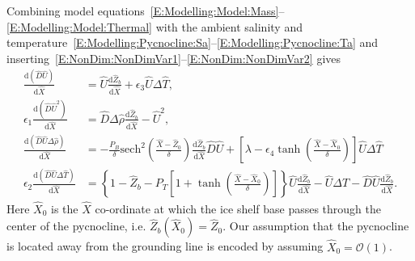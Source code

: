 \documentclass{jfm}
\newcommand{\dd}[2]{\frac{\mathrm{d} #1}{\mathrm{d} #2}}
\newcommand{\order}[1]{\mathcal{O}(#1)}
\newcommand{\epsone}{\epsilon_{1}} %
\newcommand{\epstwo}{\epsilon_{2}} %
\newcommand{\epsthree}{\epsilon_{3}} %
\newcommand{\epsfour}{\epsilon_{4}}
\newcommand{\Pb}{\textit{P}_B}  %
\newcommand{\lt}{\delta} %
\newcommand{\Pt}{\textit{P}_T}
\begin{document}
Combining model equations~\eqref{E:Modelling:Model:Mass}--\eqref{E:Modelling:Model:Thermal} with the ambient salinity and temperature~\eqref{E:Modelling:Pycnocline:Sa}--\eqref{E:Modelling:Pycnocline:Ta} and inserting~\eqref{E:NonDim:NonDimVar1}--\eqref{E:NonDim:NonDimVar2} gives
\begin{align}
\dd{(\hat{D}\hat{U})}{\hat{X}} &= \hat{U} \dd{\hat{Z}_b}{\hat{X}} +\epsthree \hat{U} \Delta \hat{T},\label{E:NonDim:mass}\\
\epsone \dd{(\hat{D}\hat{U}^2)}{\hat{X}} &= \hat{D} \Delta \hat{\rho} \dd{\hat{Z}_b}{\hat{X}} - \hat{U}^2,\label{E:NonDim:mom} \\
\dd{(\hat{D}\hat{U}\Delta \hat{\rho})}{\hat{X}}  &= -\frac{\Pb}{\delta} \mathrm{sech}^2\left(\frac{\hat{X} - \hat{Z}_0}{\lt}\right)\dd{\hat{Z}_b}{\hat{X}} \hat{D}\hat{U}+
 \left[\lambda - \epsfour \tanh \left(\frac{\hat{X} - \hat{X}_0}{\lt}\right) \right] \hat{U} \Delta \hat{T}\label{E:NonDim:buoyancy} \\
\epstwo \dd{(\hat{D}\hat{U}\Delta \hat{T})}{\hat{X}} &= \left\{1 - \hat{Z}_b - \Pt\left[1 + \tanh\left(\frac{\hat{X} - \hat{X}_0}{\lt}\right)\right]\right\} \hat{U}\dd{\hat{Z}_b}{\hat{X}}  - \hat{U}\Delta T- \hat{D}\hat{U}\dd{\hat{Z}_b}{\hat{X}}.\label{E:NonDim:thermal}
 \end{align}
Here $\hat{X}_0$ is the $\hat{X}$ co-ordinate at which the ice shelf base passes through the center of the pycnocline, i.e. $\hat{Z}_b(\hat{X}_0) = \hat{Z}_0$. Our assumption that the pycnocline is located away from the grounding line is encoded by assuming $\hat{X}_0 = \order{1}$.
 
\end{document}

